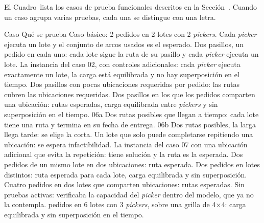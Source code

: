 \startchapter[title={Pruebas funcionales}, reference=Anexo_Pruebas]

El Cuadro~ lista los casos de prueba funcionales
descritos en la Sección~. Cuando un caso agrupa
varias pruebas, cada una se distingue con una letra.

\startplacetable[reference=tab:pruebas_funcionales, location={here,split}, title={Pruebas funcionales y qué verifica cada una.}]
	\bTABLE[split=yes, align=middle, frame=on, width=fit]
	\setupTABLE[row][1][background=color, backgroundcolor=darkgray, style=bold]
	\setupTABLE[column][2][width=13cm, align=flushleft]
	\bTABLEhead
	\bTR \bTH Caso \eTH \bTH Qué se prueba \eTH \eTR
	\eTABLEhead
	\bTABLEbody
	\bTR {} \eTD \bTD Caso básico: 2 pedidos en 2 lotes con 2 {\em pickers}. Cada {\em picker} ejecuta un lote y el conjunto de arcos usados es el esperado. \eTD \eTR
	\bTR {} \eTD \bTD Dos pasillos, un pedido en cada uno: cada lote sigue la ruta de su pasillo y cada {\em picker} ejecuta un lote. \eTD \eTR
	\bTR {} \eTD \bTD La instancia del caso 02, con controles adicionales: cada {\em picker} ejecuta exactamente un lote, la carga está equilibrada y no hay superposición en el tiempo. \eTD \eTR
	\bTR {} \eTD \bTD Dos pasillos con pocas ubicaciones requeridas por pedido: las rutas cubren las ubicaciones requeridas. \eTD \eTR
	\bTR {} \eTD \bTD Dos pasillos en los que los pedidos comparten una ubicación: rutas esperadas, carga equilibrada entre {\em pickers} y sin superposición en el tiempo. \eTD \eTR
	\bTR \bTD 06a \eTD \bTD Dos rutas posibles que llegan a tiempo: cada lote tiene una ruta y termina en su fecha de entrega. \eTD \eTR
	\bTR \bTD 06b \eTD \bTD Dos rutas posibles, la larga llega tarde: se elige la corta. \eTD \eTR
	\bTR {} \eTD \bTD Un lote que solo puede completarse repitiendo una ubicación: se espera infactibilidad. \eTD \eTR
	\bTR {} \eTD \bTD La instancia del caso 07 con una ubicación adicional que evita la repetición: tiene solución y la ruta es la esperada. \eTD \eTR
	\bTR {} \eTD \bTD Dos pedidos de un mismo lote en dos ubicaciones: ruta esperada. \eTD \eTR
	\bTR {} \eTD \bTD Dos pedidos en lotes distintos: ruta esperada para cada lote, carga equilibrada y sin superposición. \eTD \eTR
	\bTR {} \eTD \bTD Cuatro pedidos en dos lotes que comparten ubicaciones: rutas esperadas. \eTD \eTR
	\bTR {} \eTD \bTD Sin pruebas activas: verificaba la capacidad del {\em picker} dentro del modelo, que ya no la contempla. \eTD \eTR
	\bTR {} \eTD {} pedidos en 6 lotes con 3 {\em pickers}, sobre una grilla de 4×4: carga equilibrada y sin superposición en el tiempo. \eTD \eTR
